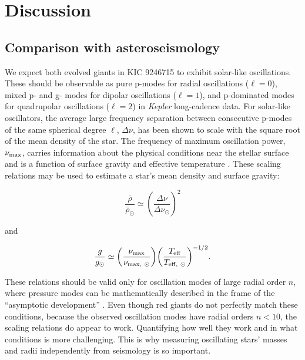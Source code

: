 \section{Discussion}\label{discuss}

\subsection{Comparison with asteroseismology}\label{seismo}
We expect both evolved giants in KIC 9246715 to exhibit solar-like oscillations. These should be observable as pure p-modes for radial oscillations ($\ell = 0$), mixed p- and g- modes for dipolar oscillations ($\ell = 1$), and p-dominated modes for quadrupolar oscillations ($\ell = 2$) in \emph{Kepler} long-cadence data. For solar-like oscillators, the average large frequency separation between consecutive p-modes of the same spherical degree $\ell$, $\Delta \nu$, has been shown to scale with the square root of the mean density of the star. The frequency of maximum oscillation power, $\nu_{\rm{max}}$, carries information about the physical conditions near the stellar surface and is a function of surface gravity and effective temperature \citep{kje95}. These scaling relations may be used to estimate a star's mean density and surface gravity:

\begin{equation} \label{density}
{\frac{\bar{\rho}}{\bar{\rho}_{\odot}}} \simeq {\left( \frac{\Delta \nu}{\Delta \nu_{\odot}} \right)}^{2}
\end{equation}

\noindent and

\begin{equation} \label{gravity}
{\frac{g}{g_{\odot}}} \simeq {\left( \frac{\nu_{\rm{max}}}{\nu_{\rm{max}, \ \odot}} \right)} {\left( \frac{T_{\rm{eff}}}{T_{\rm{eff}, \ \odot}} \right)}^{-1/2}.
\end{equation}

These relations should be valid only for oscillation modes of large radial order $n$, where pressure modes can be mathematically described in the frame of the ``asymptotic development'' \citep{tas80}. Even though red giants do not perfectly match these conditions, because the observed oscillation modes have radial orders $n < 10$, the scaling relations do appear to work. Quantifying how well they work and in what conditions is more challenging. This is why measuring oscillating stars' masses and radii independently from seismology is so important.

